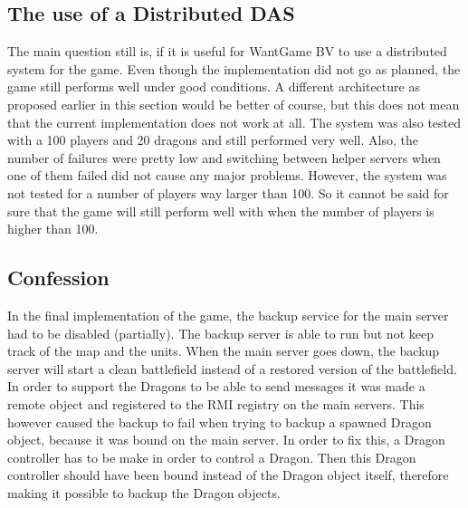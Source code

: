 \subsection{The use of a Distributed DAS}
The main question still is, if it is useful for WantGame BV to use a distributed system for the game.
Even though the implementation did not go as planned, the game still performs well under good conditions.
A different architecture as proposed earlier in this section would be better of course, but this does not mean that the current implementation does not work at all.
The system was also tested with a 100 players and 20 dragons and still performed very well.
Also, the number of failures were pretty low and switching between helper servers when one of them failed did not cause any major problems.
However, the system was not tested for a number of players way larger than 100.
So it cannot be said for sure that the game will still perform well with when the number of players is higher than 100.

\subsection{Confession}
In the final implementation of the game, the backup service for the main server had to be disabled (partially).
The backup server is able to run but not keep track of the map and the units. 
When the main server goes down, the backup server will start a clean battlefield instead of a restored version of the battlefield.
In order to support the Dragons to be able to send messages it was made a remote object and registered to the RMI registry on the main servers.
This however caused the backup to fail when trying to backup a spawned Dragon object, because it was bound on the main server.
In order to fix this, a Dragon controller has to be make in order to control a Dragon. 
Then this Dragon controller should have been bound instead of the Dragon object itself, therefore making it possible to backup the Dragon objects.



